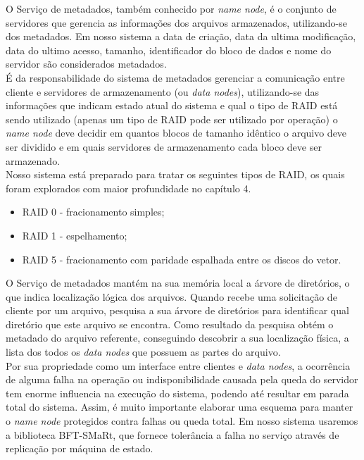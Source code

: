 O Serviço de metadados, também conhecido por \textit{name node}, é o conjunto de servidores que gerencia as informações dos arquivos armazenados, utilizando-se dos metadados. Em nosso sistema a data de criação, data da ultima modificação, data do ultimo acesso, tamanho, identificador do bloco de dados e nome do servidor são considerados metadados. 
\\

É da responsabilidade do sistema de metadados gerenciar a comunicação entre cliente e servidores de armazenamento (ou  \textit{data nodes}), utilizando-se das informações que indicam  estado atual do sistema e qual o tipo de RAID está sendo utilizado (apenas um tipo de RAID pode ser utilizado por operação) o \textit{name node} deve decidir em quantos blocos de tamanho idêntico o arquivo deve ser dividido e em quais servidores de armazenamento cada bloco deve ser armazenado.
\\ 

Nosso sistema está preparado para tratar os seguintes tipos de RAID, os quais foram explorados com maior profundidade no capítulo 4.
\\

\begin{itemize}
	\item RAID 0 - fracionamento simples;
	\item RAID 1 - espelhamento;
	\item RAID 5 - fracionamento com paridade espalhada entre os discos do vetor.
\end{itemize}

O Serviço de metadados mantém na sua memória local a árvore de diretórios, o que indica localização lógica dos arquivos. Quando recebe uma solicitação de cliente por um arquivo, pesquisa a sua árvore de diretórios para identificar qual diretório que este arquivo se encontra. Como resultado da pesquisa obtém o metadado do arquivo referente, conseguindo descobrir a sua localização física, a lista dos todos os \textit{data nodes} que possuem as partes do arquivo.
\\

Por sua propriedade como um interface entre clientes e \textit{data nodes}, a ocorrência de alguma falha na operação ou indisponibilidade causada pela queda do servidor tem  enorme influencia na execução do sistema, podendo até resultar em parada total do sistema. Assim, é muito importante elaborar uma esquema para manter o \textit{name node} protegidos contra falhas ou queda total. Em nosso sistema usaremos a biblioteca BFT-SMaRt, que fornece tolerância a falha no serviço através de replicação por máquina de estado. \\

